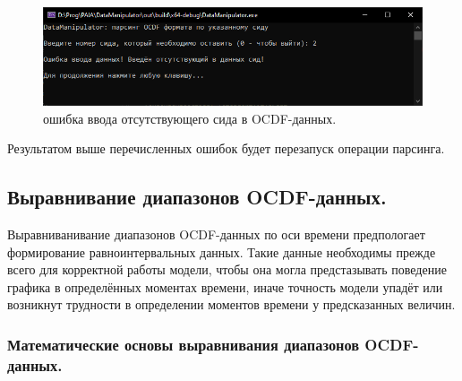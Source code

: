 {  \begin{figure}[H]
    \centering
    \includegraphics[width=\textwidth]{images/forDataManipulator/OCDFdataParsErrNotCID.png}
    \caption{ошибка ввода отсутствующего сида в OCDF-данных.} 
    \label{fig:OCDFdataParsErrnotcid}
  \end{figure}

  \par Результатом выше перечисленных ошибок будет перезапуск операции парсинга. 

}

\subsection{ \standartTitleFont
  Выравнивание диапазонов OCDF-данных.
} \label{subsec:OCDFRightIntervals}

{\standartFont

  \par Выравниванивание диапазонов OCDF-данных по оси времени предпологает формирование равноинтервальных данных. Такие данные необходимы прежде всего для корректной работы модели, чтобы она могла предстазывать поведение графика в определённых моментах времени, иначе точность модели упадёт или возникнут трудности в определении моментов времени у предсказанных величин. 

  \par 
}

\subsubsection{ \standartTitleFont
  Математические основы выравнивания диапазонов OCDF-данных.
} \label{subsubsec:OCDFRIMath}

